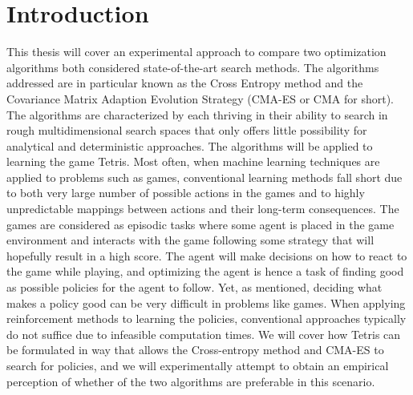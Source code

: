 \section{Introduction \label{sec:intro}}

This thesis will cover an experimental approach 
to compare two optimization algorithms both considered 
state-of-the-art search methods. The algorithms addressed
are in particular known as the Cross Entropy method and 
the Covariance Matrix Adaption Evolution Strategy (CMA-ES or CMA
for short). The algorithms are characterized by each thriving
in their ability to search in rough multidimensional 
search spaces that only offers little possibility 
for analytical and deterministic approaches.
The algorithms will be applied to 
learning the game Tetris. Most often, when machine learning
techniques are applied to problems such as games, conventional
learning methods fall short due to both  very large number of 
possible actions in the games and to highly unpredictable mappings 
between actions and their long-term consequences. The games 
are considered as episodic tasks where some agent is placed
in the game environment and interacts with the game following some
strategy that will hopefully result in a high score. 
The agent will make decisions on how to react 
to the game while playing, and optimizing the agent is hence a task of
finding good as possible policies for the agent to follow. Yet, as mentioned,
deciding what makes a policy good can be very difficult in
problems like games. When applying reinforcement methods to learning
the policies, conventional approaches typically do not suffice 
due to infeasible computation times. We will cover how
Tetris can be formulated in way that allows  the Cross-entropy method 
and CMA-ES to search for policies, and we will experimentally 
attempt to obtain an empirical perception of whether of the two algorithms
are preferable in this scenario.










